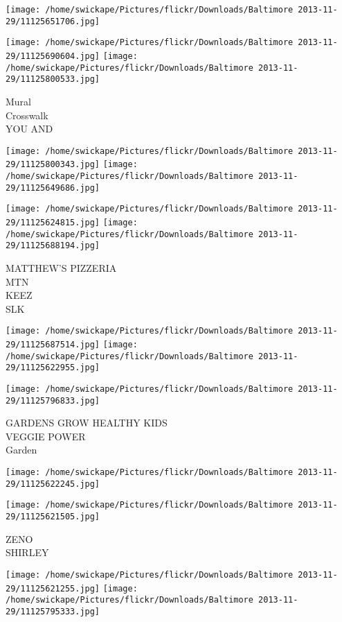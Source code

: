 \documentclass[10pt,letterpaper]{article}
\begin{document}
\texttt{[image: /home/swickape/Pictures/flickr/Downloads/Baltimore 2013-11-29/11125651706.jpg]}

\vspace{0.25in}
\texttt{[image: /home/swickape/Pictures/flickr/Downloads/Baltimore 2013-11-29/11125690604.jpg]}
\texttt{[image: /home/swickape/Pictures/flickr/Downloads/Baltimore 2013-11-29/11125800533.jpg]}

Mural\\
Crosswalk\\
YOU AND
\pagebreak

\texttt{[image: /home/swickape/Pictures/flickr/Downloads/Baltimore 2013-11-29/11125800343.jpg]}
\texttt{[image: /home/swickape/Pictures/flickr/Downloads/Baltimore 2013-11-29/11125649686.jpg]}

\texttt{[image: /home/swickape/Pictures/flickr/Downloads/Baltimore 2013-11-29/11125624815.jpg]}
\texttt{[image: /home/swickape/Pictures/flickr/Downloads/Baltimore 2013-11-29/11125688194.jpg]}

MATTHEW'S PIZZERIA\\
MTN\\
KEEZ\\
SLK
\pagebreak

\texttt{[image: /home/swickape/Pictures/flickr/Downloads/Baltimore 2013-11-29/11125687514.jpg]}
\texttt{[image: /home/swickape/Pictures/flickr/Downloads/Baltimore 2013-11-29/11125622955.jpg]}

\vspace{0.25in}
\texttt{[image: /home/swickape/Pictures/flickr/Downloads/Baltimore 2013-11-29/11125796833.jpg]}

GARDENS GROW HEALTHY KIDS\\
VEGGIE POWER\\
Garden
\pagebreak

\texttt{[image: /home/swickape/Pictures/flickr/Downloads/Baltimore 2013-11-29/11125622245.jpg]}

\vspace{0.25in}
\texttt{[image: /home/swickape/Pictures/flickr/Downloads/Baltimore 2013-11-29/11125621505.jpg]}

ZENO\\
SHIRLEY
\pagebreak

\texttt{[image: /home/swickape/Pictures/flickr/Downloads/Baltimore 2013-11-29/11125621255.jpg]}
\texttt{[image: /home/swickape/Pictures/flickr/Downloads/Baltimore 2013-11-29/11125795333.jpg]}
\end{document}
